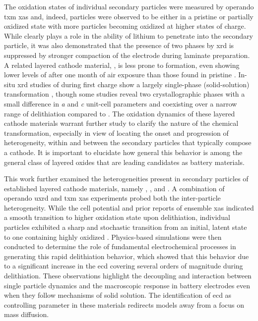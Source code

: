 \documentclass{article}
\begin{document}
The oxidation states of individual secondary particles were measured
by operando \gls{txm} \gls{xas} and, indeed, particles were observed
to be either in a pristine or partially oxidized state with more
particles becoming oxidized at higher states of
charge\cite{nowack2016}. While  clearly plays a role in the
ability of lithium to penetrate into the secondary particle, it was
also demonstrated that the presence of two phases by \gls{xrd} is
suppressed by stronger compaction of the electrode during laminate
preparation\cite{bobrikov2018}. A related layered cathode material,
\nmc[333]{}, is less prone to  formation, even showing
lower levels of  after one month of air exposure than those
found in pristine \nca{}\cite{shizuka2007}. In-situ \gls{xrd} studies
of \nmc[333]{} during first charge show a largely single-phase
(solid-solution) transformation \cite{hulzen2018,ahn2017,zhou2016-2},
though some studies reveal two crystallographic phases with a small
difference in \emph{a} and \emph{c} unit-cell parameters and
coexisting over a narrow range of delithiation compared to
\nca{}\cite{yoon2006,hua2018}. The oxidation dynamics of these layered
cathode materials warrant further study to clarify the nature of the
chemical transformation, especially in view of locating the onset and
progression of heterogeneity, within and between the secondary
particles that typically compose a cathode. It is important to
elucidate how general this behavior is among the general class of
layered oxides that are leading candidates as battery materials.

This work further examined the heterogeneities present in secondary
particles of established layered cathode materials, namely \nca{},
\nmc[333]{}, and \nmc[532]{}. A combination of operando \gls{uxrd} and
\gls{txm} \gls{xas} experiments probed both the inter-particle
heterogeneity. While the cell potential and prior reports of ensemble
\gls{xas} indicated a smooth transition to higher oxidation state upon
delithiation\cite{deb2005,muto2009}, individual particles exhibited a
sharp and stochastic transition from an initial, latent state to one
containing highly oxidized . Physics-based simulations were then
conducted to determine the role of fundamental electrochemical
processes in generating this rapid delithiation behavior, which showed that this behavior due to a significant increase in the \gls{ecd} covering several orders
of magnitude during delithiation. These observations highlight the decoupling and interaction between single particle dynamics and the macroscopic response in battery electrodes even when they follow mechanisms of solid solution. The identification of \gls{ecd} as controlling parameter in these materials redirects models away from a focus on mass diffusion. 
\end{document}
